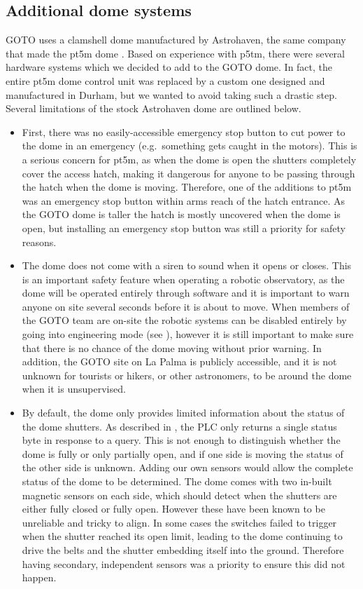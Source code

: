 \subsection{Additional dome systems}
\label{sec:arduino}
\begin{colsection}

GOTO uses a clamshell dome manufactured by Astrohaven, the same company that made the pt5m dome \citep{pt5m}. Based on experience with p5tm, there were several hardware systems which we decided to add to the GOTO dome. In fact, the entire pt5m dome control unit was replaced by a custom one designed and manufactured in Durham, but we wanted to avoid taking such a drastic step. Several limitations of the stock Astrohaven dome are outlined below.
%
\begin{itemize}
    \item First, there was no easily-accessible emergency stop button to cut power to the dome in an emergency (e.g.\ something gets caught in the motors). This is a serious concern for pt5m, as when the dome is open the shutters completely cover the access hatch, making it dangerous for anyone to be passing through the hatch when the dome is moving. Therefore, one of the additions to pt5m was an emergency stop button within arms reach of the hatch entrance. As the GOTO dome is taller the hatch is mostly uncovered when the dome is open, but installing an emergency stop button was still a priority for safety reasons.
    \item The dome does not come with a siren to sound when it opens or closes. This is an important safety feature when operating a robotic observatory, as the dome will be operated entirely through software and it is important to warn anyone on site several seconds before it is about to move. When members of the GOTO team are on-site the robotic systems can be disabled entirely by going into engineering mode (see ), however it is still important to make sure that there is no chance of the dome moving without prior warning. In addition, the GOTO site on La Palma is publicly accessible, and it is not unknown for tourists or hikers, or other astronomers, to be around the dome when it is unsupervised.
    \item By default, the dome  only provides limited information about the status of the dome shutters. As described in , the PLC only returns a single status byte in response to a query. This is not enough to distinguish whether the dome is fully or only partially open, and if one side is moving the status of the other side is unknown. Adding our own sensors would allow the complete status of the dome to be determined. The dome comes with two in-built magnetic sensors on each side, which should detect when the shutters are either fully closed or fully open. However these have been known to be unreliable and tricky to align. In some cases the switches failed to trigger when the shutter reached its open limit, leading to the dome continuing to drive the belts and the shutter embedding itself into the ground. Therefore having secondary, independent sensors was a priority to ensure this did not happen.

\end{itemize}
\end{colsection}
